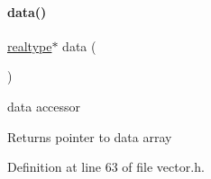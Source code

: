 \mbox{\label{classamici_1_1_ami_vector_aee17a5447b8e03180f89a2a8acbd572f}} 
\paragraph{\texorpdfstring{data()}{data()}\hspace{0.1cm}{\footnotesize\ttfamily [1/2]}}
{\footnotesize\ttfamily \mbox{\hyperlink{namespaceamici_a1bdce28051d6a53868f7ccbf5f2c14a3}{realtype}}$\ast$ data (\begin{DoxyParamCaption}{ }\end{DoxyParamCaption})}

data accessor \begin{DoxyReturn}{Returns}
pointer to data array 
\end{DoxyReturn}


Definition at line 63 of file vector.\+h.

